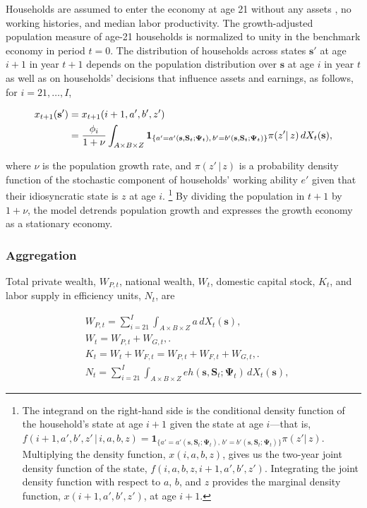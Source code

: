 \documentclass[11pt,leqno,fleqn]{article}
\begin{document}
Households are assumed to enter the economy at age 21 without any assets , no working histories, and median labor productivity. The growth-adjusted population measure of age-21 households is normalized to unity in the benchmark economy in period $t=0$. The distribution of households across states $\mathbf{s}'$ at age $i+1$ in year $t+1$ depends on the population distribution over $\mathbf{s}$ at age $i$ in year $t$ as well as on households' decisions that influence assets and earnings, as follows, for $i=21,\ldots,I$,

\begin{align}
	x_{t+1}(\mathbf{s}')&=x_{t+1}(i+1,a',b',z')\label{E:dist}\\
	&=\frac{\phi_{i}}{1+\nu}\int_{A\times B\times Z}\mathbf{1}_{\{
	a'=a'(\mathbf{s},\mathbf{S}_{t};\mathbf{\Psi}_{t}),\,
	b'=b'(\mathbf{s},\mathbf{S}_{t};\mathbf{\Psi}_{t})\}}
	\pi(z'|\,z)\,dX_{t}(\mathbf{s}),\notag
\end{align}

where $\nu$ is the population growth rate, and $\pi(z'\,|\,z)$ is a probability density function of the stochastic component of households' working ability $e'$ given that their idiosyncratic state is $z$ at age $i$.%
\footnote{The integrand on the right-hand side is the conditional density function of the household's state at age $i+1$ given the state at age $i$---that is, $f(i+1,a',b',z'\,|\,i,a,b,z)=\mathbf{1}_{\{
	a'=a'(\mathbf{s},\mathbf{S}_{t};\mathbf{\Psi}_{t}),\,
	b'=b'(\mathbf{s},\mathbf{S}_{t};\mathbf{\Psi}_{t})\}}
	\pi(z'|\,z)$. Multiplying the density function, $x(i,a,b,z)$, gives us the two-year joint density function of the state, $f(i,a,b,z,i+1,a',b',z')$. Integrating the joint density function with respect to $a$, $b$, and $z$ provides the marginal density function, $x(i+1,a',b',z')$, at age $i+1$.}
By dividing the population in $t+1$ by $1+\nu$, the model detrends population growth and expresses the growth economy as a stationary economy.


\subsubsection{Aggregation}
Total private wealth, $W_{P,t}$, national wealth, $W_{t}$, domestic capital stock, $K_{t}$, and labor supply in efficiency units, $N_{t}$, are

\begin{align}
	&W_{P,t}=\sum_{i=21}^{I}\int_{A\times B\times Z}a\,dX_{t}(\mathbf{s}),
	\label{E:capital}\\
	&W_{t}=W_{P,t}+W_{G,t},\biggr.\\
	&K_{t}=W_{t}+W_{F,t}=W_{P,t}+W_{F,t}+W_{G,t},\biggr.\\
	&N_{t}=\sum_{i=21}^{I}\int_{A\times B\times Z} eh(\mathbf{s},\mathbf{S}_{t};
	\mathbf{\Psi}_{t})\,dX_{t}(\mathbf{s}),\label{E:labor}
\end{align}
\end{document}
